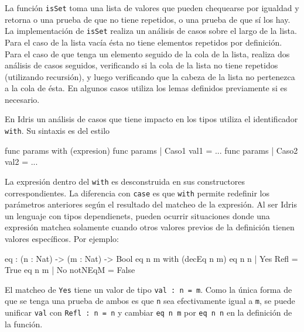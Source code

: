 
 La función \texttt{isSet} toma una lista de valores que pueden chequearse por igualdad y retorna o una prueba de que no tiene repetidos, o una prueba de que sí los hay. La implementación de \texttt{isSet} realiza un análisis de casos sobre el largo de la lista. Para el caso de la lista vacía ésta no tiene elementos repetidos por definición. Para el caso de que tenga un elemento seguido de la cola de la lista, realiza dos análisis de casos seguidos, verificando si la cola de la lista no tiene repetidos (utilizando recursión), y luego verificando que la cabeza de la lista no pertenezca a la cola de ésta. En algunos casos utiliza los lemas definidos previamente si es necesario.

En Idris un análisis de casos que tiene impacto en los tipos utiliza el identificador \texttt{with}. Su sintaxis es del estilo

\begin{code}
func params with (expresion)
  func params | Caso1 val1 = ...
  func params | Caso2 val2 = ...
\end{code}

La expresión dentro del \texttt{with} es desconstruida en sus constructores correspondientes. La diferencia con \texttt{case} es que \texttt{with} permite redefinir los parámetros anteriores según el resultado del matcheo de la expresión. Al ser Idris un lenguaje con tipos dependienets, pueden ocurrir situaciones donde una expresión matchea solamente cuando otros valores previos de la definición tienen valores específicos. Por ejemplo:

\begin{code}
eq : (n : Nat) -> (m : Nat) -> Bool
eq n m with (decEq n m)
  eq n n | Yes Refl = True
  eq n m | No notNEqM = False
\end{code}

El matcheo de \texttt{Yes} tiene un valor de tipo \texttt{val : n = m}. Como la única forma de que se tenga una prueba de ambos es que \texttt{n} sea efectivamente igual a \texttt{m}, se puede unificar \texttt{val} con \texttt{Refl : n = n} y cambiar \texttt{eq n m} por \texttt{eq n n} en la definición de la función.

